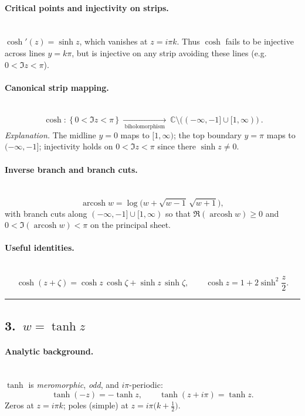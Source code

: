 \documentclass[11pt]{article}
\begin{document}
\medskip

\paragraph{Critical points and injectivity on strips.}\mbox{}\\[2pt]
$\cosh'(z)=\sinh z$, which vanishes at $z=i\pi k$. Thus $\cosh$ fails to be injective across lines $y=k\pi$, but is injective on any strip avoiding these lines (e.g.\ $0<\Im z<\pi$).

\medskip

\paragraph{Canonical strip mapping.}\mbox{}\\[2pt]
\[
\boxed{\
	\cosh:\ \{\,0<\Im z<\pi\,\}\ \xrightarrow[\ \text{biholomorphism}\ ]{}\ 
	\mathbb C\setminus\big((-\infty,-1]\cup[1,\infty)\big)\ .
}
\]
\emph{Explanation.} The midline $y=0$ maps to $[1,\infty)$; the top boundary $y=\pi$ maps to $(-\infty,-1]$; injectivity holds on $0<\Im z<\pi$ since there $\sinh z\neq0$.

\medskip

\paragraph{Inverse branch and branch cuts.}\mbox{}\\[2pt]
\[
\operatorname{arcosh} w=\log\!\Big(w+\sqrt{w-1}\,\sqrt{w+1}\Big),
\]
with branch cuts along $(-\infty,-1]\cup[1,\infty)$ so that $\Re(\operatorname{arcosh} w)\ge0$ and $0<\Im(\operatorname{arcosh} w)<\pi$ on the principal sheet.

\medskip

\paragraph{Useful identities.}\mbox{}\\[2pt]
\[
\cosh(z+\zeta)=\cosh z\,\cosh\zeta+\sinh z\,\sinh\zeta,\qquad
\cosh z=1+2\sinh^{2}\!\frac{z}{2}.
\]

\bigskip\hrule\bigskip

\subsection*{3.\ $w=\tanh z$}

\paragraph{Analytic background.}\mbox{}\\[2pt]
$\tanh$ is \emph{meromorphic}, \emph{odd}, and $i\pi$-periodic:
\[
\tanh(-z)=-\tanh z,\qquad \tanh(z+i\pi)=\tanh z.
\]
Zeros at $z=i\pi k$; poles (simple) at $z=i\pi\big(k+\tfrac12\big)$.
\end{document}
